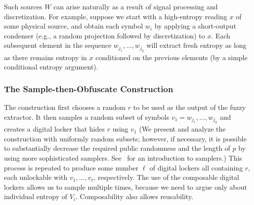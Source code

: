\documentclass[11pt]{article}
\renewcommand{\paragraph}[1]{\subsubsection{#1}}
\begin{document}
Such sources $W$ can arise naturally as a result of signal processing and discretization. For example, suppose we start with a high-entropy reading $x$ of some physical source, and obtain each symbol $w_i$ by applying a short-output condenser (e.g., a random projection followed by discretization) to $x$. 
Each subsequent element in the sequence $w_{j_1}, \dots, w_{j_\eta}$ will extract fresh entropy as long as there remains entropy in $x$ conditioned on the previous elements (by a simple conditional entropy argument).


\paragraph{The Sample-then-Obfuscate Construction}
The construction first chooses a random $r$ to be used as the output of the fuzzy extractor. It then samples a random subset of symbols $v_1=w_{j_1},..., w_{j_\eta}$ and creates a digital locker that hides $r$ using $v_1$ (We present and analyze the construction with uniformly random subsets; however, if necessary, it is possible to substantially decrease the required public randomness and the length of $p$ by using more sophisticated samplers. See~\cite{goldreich2011sample} for an introduction to samplers.) This process is repeated to produce some number $\ell$ of digital lockers all containing $r$,  each unlockable with $v_1,..., v_\ell$, respectively. The use of the composable digital lockers allows us to sample multiple times, because we need to argue only about individual entropy of $V_i$.  Composability also allows reusability.
\end{document}
